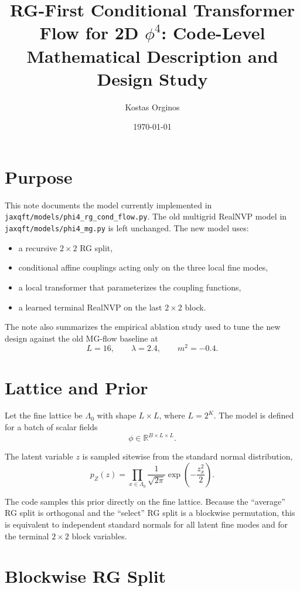 \documentclass[11pt]{article}
\title{RG-First Conditional Transformer Flow for 2D $\phi^4$: Code-Level Mathematical Description and Design Study}
\author{Kostas Orginos}
\date{\today}
\begin{document}
\maketitle

\section{Purpose}

This note documents the model currently implemented in
\texttt{jaxqft/models/phi4\_rg\_cond\_flow.py}. The old multigrid RealNVP
model in \texttt{jaxqft/models/phi4\_mg.py} is left unchanged. The new model
uses:
\begin{itemize}
\item a recursive $2\times 2$ RG split,
\item conditional affine couplings acting only on the three local fine modes,
\item a local transformer that parameterizes the coupling functions,
\item a learned terminal RealNVP on the last $2\times 2$ block.
\end{itemize}

The note also summarizes the empirical ablation study used to tune the new
design against the old MG-flow baseline at
\[
L=16,\qquad \lambda=2.4,\qquad m^2=-0.4.
\]

\section{Lattice and Prior}

Let the fine lattice be $\Lambda_0$ with shape $L\times L$, where
$L=2^K$. The model is defined for a batch of scalar fields
\[
\phi \in \mathbb{R}^{B\times L\times L}.
\]

The latent variable $z$ is sampled sitewise from the standard normal
distribution,
\begin{equation}
p_Z(z)=\prod_{x\in\Lambda_0}\frac{1}{\sqrt{2\pi}}
\exp\!\left(-\frac{z_x^2}{2}\right).
\end{equation}

The code samples this prior directly on the fine lattice. Because the
``average'' RG split is orthogonal and the ``select'' RG split is a blockwise
permutation, this is equivalent to independent standard normals for all latent
fine modes and for the terminal $2\times 2$ block variables.

\section{Blockwise RG Split}
\end{document}
